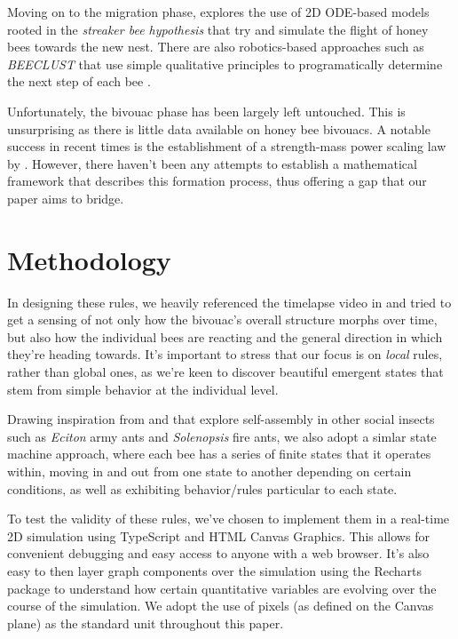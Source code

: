 \documentclass[a4paper,10pt]{article}
\begin{document}
\begin{multicols}{2}
    Moving on to the migration phase, \cite{fetecau2012mathematical} explores the use of 2D ODE-based models
    rooted in the \textit{streaker bee hypothesis} that try and simulate the flight of honey bees towards
    the new nest. There are also robotics-based approaches such as \textit{BEECLUST}
    that use simple qualitative principles to programatically determine the next step of each bee
    \cite{schmickl2011beeclust}.

    Unfortunately, the bivouac phase has been largely left untouched. This is unsurprising as there is
    little data available on honey bee bivouacs. A notable success in recent times is the establishment
    of a strength-mass power scaling law by \cite{shishkov2022strength}. However, there haven't been
    any attempts to establish a mathematical framework that describes this formation process, thus
    offering a gap that our paper aims to bridge.

    \section{Methodology}

    In designing these rules, we heavily referenced the timelapse video in
    \cite{peleg2018collective} and tried to get a sensing of not only how the bivouac's overall
    structure morphs over time, but also how the individual bees are reacting and the general
    direction in which they're heading towards. It's important to stress that our focus is on
    \textit{local} rules, rather than global ones, as we're keen to discover beautiful
    emergent states that stem from simple behavior at the individual level.

    Drawing inspiration from \cite{anderson2002self} and \cite{carlesso2023become} that explore self-assembly
    in other social insects such as \textit{Eciton} army ants and \textit{Solenopsis} fire ants, we also adopt
    a simlar state machine approach, where each bee has a series of finite states that it operates
    within, moving in and out from one state to another depending on certain conditions, as well as
    exhibiting behavior/rules particular to each state.

    To test the validity of these rules, we've chosen to implement them in a real-time 2D simulation
    using TypeScript and HTML Canvas Graphics. This allows for convenient debugging and easy access
    to anyone with a web browser. It's also easy to then layer graph components over the simulation
    using the Recharts package to understand how certain quantitative variables are evolving over the
    course of the simulation. We adopt the use of pixels (as defined on the Canvas plane) as the standard
    unit throughout this paper.


\end{multicols}
\end{document}
